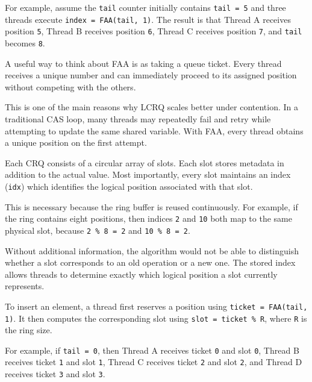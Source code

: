 For example, assume the \texttt{tail} counter initially contains \texttt{tail = 5} and three threads execute \texttt{index = FAA(tail, 1)}. The result is that Thread A receives position \texttt{5}, Thread B receives position \texttt{6}, Thread C receives position \texttt{7}, and \texttt{tail} becomes \texttt{8}. \cite{lcrq}


A useful way to think about FAA is as taking a queue ticket. Every thread receives a unique number and can immediately proceed to its assigned position without competing with the others. \cite{lcrq}

This is one of the main reasons why LCRQ scales better under contention. In a traditional CAS loop, many threads may repeatedly fail and retry while attempting to update the same shared variable. With FAA, every thread obtains a unique position on the first attempt. \cite{lcrq}

Each CRQ consists of a circular array of slots. Each slot stores metadata in addition to the actual value. Most importantly, every slot maintains an index (\texttt{idx}) which identifies the logical position associated with that slot. \cite{lcrq}


This is necessary because the ring buffer is reused continuously. For example, if the ring contains eight positions, then indices \texttt{2} and \texttt{10} both map to the same physical slot, because \texttt{2 \% 8 = 2} and \texttt{10 \% 8 = 2}. \cite{lcrq}

Without additional information, the algorithm would not be able to distinguish whether a slot corresponds to an old operation or a new one. The stored index allows threads to determine exactly which logical position a slot currently represents. \cite{lcrq}

To insert an element, a thread first reserves a position using \texttt{ticket = FAA(tail, 1)}. It then computes the corresponding slot using \texttt{slot = ticket \% R}, where \texttt{R} is the ring size. \cite{lcrq}

For example, if \texttt{tail = 0}, then Thread A receives ticket \texttt{0} and slot \texttt{0}, Thread B receives ticket \texttt{1} and slot \texttt{1}, Thread C receives ticket \texttt{2} and slot \texttt{2}, and Thread D receives ticket \texttt{3} and slot \texttt{3}. \cite{lcrq}


